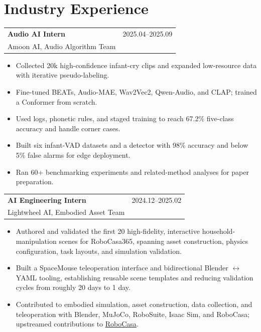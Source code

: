 \documentclass[10pt,letterpaper]{article}
\makeatletter
\newcommand{\heading}[4]{%
  \begin{tabularx}{\textwidth}{@{}Xr@{}}
    \textbf{#1} & {\color{muted}#2}\\[-0.18em]
    {\footnotesize\color{muted}#3} & {\footnotesize\color{muted}#4}
  \end{tabularx}\vspace{-0.15em}
}
\makeatother
\begin{document}
\section{Industry Experience}
\heading{Audio AI Intern}{2025.04--2025.09}{Amoon AI, Audio Algorithm Team}{}
\begin{itemize}
  \item Collected 20k high-confidence infant-cry clips and expanded low-resource data with iterative pseudo-labeling.
  \item Fine-tuned BEATs, Audio-MAE, Wav2Vec2, Qwen-Audio, and CLAP; trained a Conformer from scratch.
  \item Used logs, phonetic rules, and staged training to reach 67.2\% five-class accuracy and handle corner cases.
  \item Built six infant-VAD datasets and a detector with 98\% accuracy and below 5\% false alarms for edge deployment.
  \item Ran 60+ benchmarking experiments and related-method analyses for paper preparation.
\end{itemize}

\heading{AI Engineering Intern}{2024.12--2025.02}{Lightwheel AI, Embodied Asset Team}{}
\begin{itemize}
  \item Authored and validated the first 20 high-fidelity, interactive household-manipulation scenes for RoboCasa365, spanning asset construction, physics configuration, task layouts, and simulation validation.
  \item Built a SpaceMouse teleoperation interface and bidirectional Blender $\leftrightarrow$ YAML tooling, establishing reusable scene templates and reducing validation cycles from roughly 20 days to 1 day.
  \item Contributed to embodied simulation, asset construction, data collection, and teleoperation with Blender, MuJoCo, RoboSuite, Isaac Sim, and RoboCasa; upstreamed contributions to \href{https://github.com/robocasa/robocasa}{RoboCasa}.
\end{itemize}

\newpage
\end{document}
